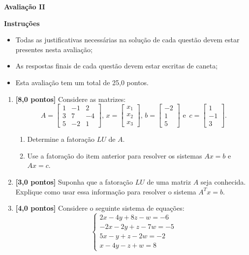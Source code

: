 \documentclass[12pt,a4paper]{article}
\begin{document}
\begin{center}
 \textbf{Avaliação II}
\end{center}

\textbf{Instruções}
\begin{itemize}
 \item Todas as justificativas necessárias na solução de cada questão devem estar presentes nesta avaliação;
 \item As respostas finais de cada questão devem estar escritas de caneta;
 \item Esta avaliação tem um total de 25,0 pontos.
\end{itemize}

\begin{enumerate}

 \item \textbf{[8,0 pontos]} Considere as matrizes:
$$A=\begin{bmatrix}1 & - 1 & 2 \\ 3 & 7 & -4 \\ 5 & -2 & 1\end{bmatrix}, \, 
x=\begin{bmatrix}x_1 \\ x_2 \\ x_3\end{bmatrix}, \, 
b=\begin{bmatrix}-2 \\ 1 \\ 5\end{bmatrix} \textrm{ e }\,
c=\begin{bmatrix}1 \\ -1 \\ 3\end{bmatrix}. 
$$

  \begin{enumerate}
    \item Determine a fatoração $LU$ de $A$.
    \item Use a fatoração do item anterior para resolver os sistemas $Ax = b$ e $Ax = c$.
  \end{enumerate}

\item \textbf{[3,0 pontos]} Suponha que a fatoração $LU$ de uma matriz $A$ seja conhecida. Explique como usar essa informação para resolver o 
sistema $A^Tx = b$.

 \item \textbf{[4,0 pontos]} Considere o seguinte sistema de equações:
  $$%
   \begin{cases}
    2x - 4y + 8z  - w = -6 \\
    -2x  - 2y + z - 7w = -5 \\
    5x  - y + z - 2w = -2 \\
    x - 4y - z + w = 8
   \end{cases}
  $$


\end{enumerate}
\end{document}
